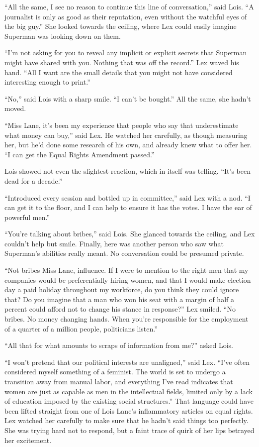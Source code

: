 \documentclass[ebook,12pt]{memoir}
\begin{document}
``All the same, I see no reason to continue this line of conversation,''
said Lois. ``A journalist is only as good as their reputation, even
without the watchful eyes of the big guy.'' She looked towards the
ceiling, where Lex could easily imagine Superman was looking down on
them.

``I'm not asking for you to reveal any implicit or explicit secrets that
Superman might have shared with you. Nothing that was off the record.''
Lex waved his hand. ``All I want are the small details that you might
not have considered interesting enough to print.''

``No,'' said Lois with a sharp smile. ``I can't be bought.'' All the
same, she hadn't moved.

``Miss Lane, it's been my experience that people who say that
underestimate what money can buy,'' said Lex. He watched her carefully,
as though measuring her, but he'd done some research of his own, and
already knew what to offer her. ``I can get the Equal Rights Amendment
passed.''

Lois showed not even the slightest reaction, which in itself was
telling. ``It's been dead for a decade.''

``Introduced every session and bottled up in committee,'' said Lex with
a nod. ``I can get it to the floor, and I can help to ensure it has the
votes. I have the ear of powerful men.''

``You're talking about bribes,'' said Lois. She glanced towards the
ceiling, and Lex couldn't help but smile. Finally, here was another
person who saw what Superman's abilities really meant. No conversation
could be presumed private.

``Not bribes Miss Lane, influence. If I were to mention to the right men
that my companies would be preferentially hiring women, and that I would
make election day a paid holiday throughout my workforce, do you think
they could ignore that? Do you imagine that a man who won his seat with
a margin of half a percent could afford not to change his stance in
response?'' Lex smiled. ``No bribes. No money changing hands. When
you're responsible for the employment of a quarter of a million people,
politicians listen.''

``All that for what amounts to scraps of information from me?'' asked
Lois.

``I won't pretend that our political interests are unaligned,'' said
Lex. ``I've often considered myself something of a feminist. The world
is set to undergo a transition away from manual labor, and everything
I've read indicates that women are just as capable as men in the
intellectual fields, limited only by a lack of education imposed by the
existing social structures.'' That language could have been lifted
straight from one of Lois Lane's inflammatory articles on equal rights.
Lex watched her carefully to make sure that he hadn't said things too
perfectly. She was trying hard not to respond, but a faint trace of
quirk of her lips betrayed her excitement.
\end{document}
